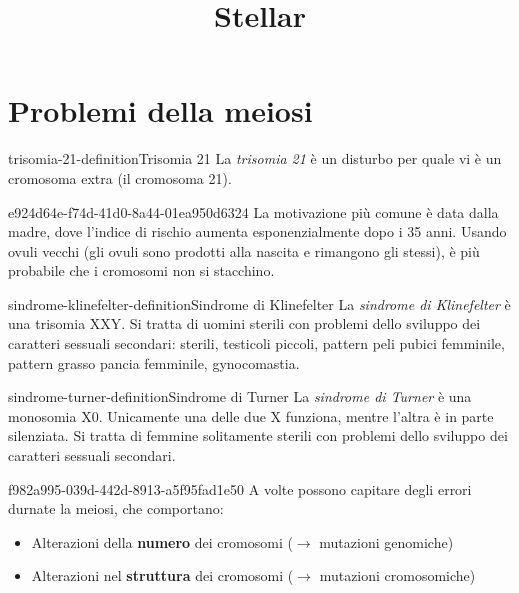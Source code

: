 \documentclass[preview]{standalone}
\begin{document}
\title{Stellar}
\genpage

\section{Problemi della meiosi}

\begin{snippetdefinition}{trisomia-21-definition}{Trisomia 21}
    La \textit{trisomia 21} è un disturbo per quale vi è un cromosoma extra (il cromosoma 21).
\end{snippetdefinition}


\begin{snippet}{e924d64e-f74d-41d0-8a44-01ea950d6324}
    La motivazione più comune è data dalla madre, dove l'indice di rischio aumenta
    esponenzialmente dopo i 35 anni.
    Usando ovuli vecchi (gli ovuli sono prodotti alla nascita e rimangono gli stessi),
    è più probabile che i cromosomi non si stacchino.
\end{snippet}


\begin{snippetdefinition}{sindrome-klinefelter-definition}{Sindrome di Klinefelter}
    La \textit{sindrome di Klinefelter}
    è una trisomia XXY. Si tratta di uomini sterili con problemi dello sviluppo
    dei caratteri sessuali secondari:
    sterili, testicoli piccoli, pattern peli pubici femminile,
    pattern grasso pancia femminile, gynocomastia.
\end{snippetdefinition}

\begin{snippetdefinition}{sindrome-turner-definition}{Sindrome di Turner}
    La \textit{sindrome di Turner} è
    una monosomia X0. Unicamente una delle due X funziona,
    mentre l'altra è in parte silenziata. Si tratta di femmine
    solitamente sterili con problemi dello sviluppo dei caratteri sessuali secondari.
\end{snippetdefinition}

\begin{snippet}{f982a995-039d-442d-8913-a5f95fad1e50}
    A volte possono capitare degli errori durnate la meiosi, che comportano:
    \begin{itemize}
        \item Alterazioni della \textbf{numero} dei cromosomi (\(\rightarrow\) mutazioni genomiche)
        \item Alterazioni nel \textbf{struttura} dei cromosomi (\(\rightarrow\) mutazioni cromosomiche)
    \end{itemize}
\end{snippet}
\end{document}
